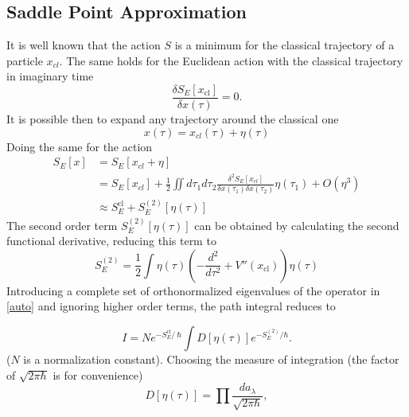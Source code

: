 \documentclass[a0,portrait]{a0poster}
\begin{document}
\begin{multicols}{3}
\subsection{Saddle Point Approximation}
It is well known that the action $S$ is a minimum for the classical trajectory of a particle $x_{cl}$. The same holds for the Euclidean action with the classical trajectory in imaginary time
\begin{equation}
\frac{\delta S_E[x_{\textrm{cl}}]}{\delta x(\tau)} = 0.
\end{equation}
It is possible then to expand any trajectory around the classical one
\begin{equation}
x(\tau) = x_{cl}(\tau) + \eta(\tau)
\end{equation}
Doing the same for the action
\begin{align}
S_{E}[x] &= S_{E}[x_{cl} + \eta] \\
&= S_{E}[x_{cl}] + \frac{1}{2} \iint  d\tau_1 d\tau_2 \frac{\delta^2 S_E[x_{cl}]}{\delta x(\tau_1) \delta x(\tau_2)} \eta(\tau_1) + O(\eta^3) \\
&\approx S_E^{\textrm{cl}} + S_E^{(2)}[\eta(\tau)]
\end{align} 
The second order term $S_E^{(2)}[\eta(\tau)]$ can be obtained by calculating the second functional derivative, reducing this term to
\begin{equation}\label{auto}
S_E^{(2)} = \frac{1}{2} \int \eta(\tau) \left( - \frac{d^2}{d\tau^2} + V''(x_{\text{cl}})\right) \eta(\tau)
\end{equation} 
Introducing a complete set of orthonormalized eigenvalues of the operator in \ref{auto} and ignoring higher order terms, the path integral reduces to 


\begin{equation}\label{pisc}
I = Ne^{-S_E^{\textrm{cl}} /\ \hbar} \int D[\eta(\tau)] e^{-S_E^{(2)}/\hbar}.
\end{equation} 
($N$ is a normalization constant). Choosing the measure of integration (the factor of $\sqrt{2\pi\hbar}$ is for convenience)
\begin{equation}
D[\eta(\tau)] = \prod \frac{da_\lambda}{\sqrt{2\pi\hbar}},
\end{equation}


\end{multicols}
\end{document}
